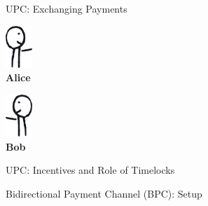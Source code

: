\documentclass[]{beamer}
\begin{document}
\begin{frame}{UPC: Exchanging Payments}


\begin{minipage}{0.1\linewidth}
		\vspace{-0.5cm}
		\centering
		\includegraphics[width=1cm]{../assets/images/agents/handing_right}
		\\ \hspace{-0.35cm} \textbf{Alice}
	\end{minipage}%
	\begin{minipage}{0.8\linewidth}
		\begin{figure}
		\begin{tikzpicture}[scale=0.9, every node/.style={scale=0.9}]
			
		\end{tikzpicture}
		\vspace{0.5cm}
		\end{figure}
	\end{minipage}%
	\begin{minipage}{0.1\linewidth}
		\vspace{-0.5cm}
		\centering
		\includegraphics[width=1cm]{../assets/images/agents/handing_left}
		\\ \hspace{0.3cm}\textbf{Bob}
	\end{minipage}

\end{frame}




\begin{frame}{UPC: Incentives and Role of Timelocks}


\end{frame}


\begin{frame}{Bidirectional Payment Channel (BPC): Setup}




\end{frame}
\end{document}
